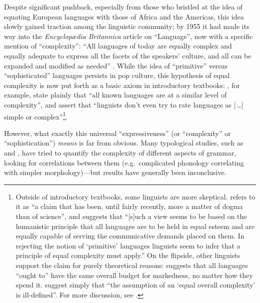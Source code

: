 \documentclass[12pt,twoside]{article}
\begin{document}
Despite significant pushback, especially from those who bristled at the idea of equating European languages with those of Africa and the Americas, this idea slowly gained traction among the linguistic community; by 1955 it had made its way into the \emph{Encyclopædia Britannica} article on ``Language'', now with a specific mention of ``complexity'': ``All languages of today are equally complex and equally adequate to express all the facets of the speakers' culture, and all can be expanded and modified as needed'' \citep[698]{trager}. While the idea of ``primitive'' versus ``sophisticated'' languages persists in pop culture, this hypothesis of equal complexity is now put forth as a basic axiom in introductory textbooks: \citet[8]{akmajian}, for example, state plainly that ``all known languages are at a similar level of complexity'', and \citet[8]{ogrady} assert that ``linguists don't even try to rate languages as [\,\ldots] simple or complex''\footnote{Outside of introductory textbooks, some linguists are more skeptical. \citet[2]{shosted} refers to it as ``a claim that has been, until fairly recently, more a matter of dogma than of science'', and \citet[216]{maddieson} suggests that ``[s]uch a view seems to be based on the humanistic principle that all languages are to be held in equal esteem and are equally capable of serving the communicative demands placed on them. In rejecting the notion of `primitive' languages linguists seem to infer that a principle of equal complexity must apply.'' On the flipside, other linguists support the claim for purely theoretical reasons: \citet[165-166]{chomsky} suggests that all languages ``ought to'' have the same overall budget for markedness, no matter how they spend it. \citet[540]{pellegrino} suggest simply that ``the assumption of an `equal overall complexity' is ill-defined''. For more discussion, see \cite{joseph}.}.


However, what exactly this universal ``expressiveness'' (or ``complexity'' or ``sophistication'') \emph{means} is far from obvious. Many typological studies, such as \citet{maddieson} and \citet{shosted}, have tried to quantify the complexity of different aspects of grammar, looking for correlations between them (e.g.\ complicated phonology correlating with simpler morphology)---but results have generally been inconclusive.
\end{document}
